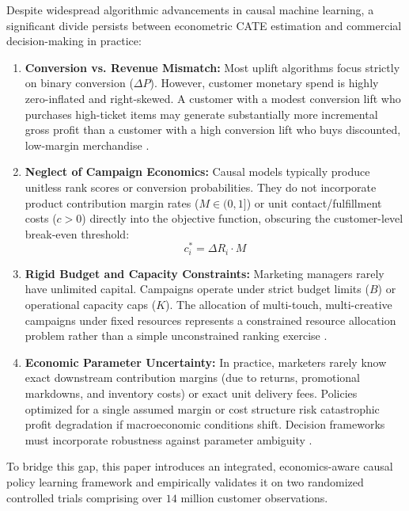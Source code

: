\documentclass[11pt,a4paper]{article}
\begin{document}
Despite widespread algorithmic advancements in causal machine learning, a significant divide persists between econometric CATE estimation and commercial decision-making in practice:
\begin{enumerate}
    \item \textbf{Conversion vs. Revenue Mismatch:} Most uplift algorithms focus strictly on binary conversion ($\Delta P$). However, customer monetary spend is highly zero-inflated and right-skewed. A customer with a modest conversion lift who purchases high-ticket items may generate substantially more incremental gross profit than a customer with a high conversion lift who buys discounted, low-margin merchandise \citep{lo2002true, gubela2019conversion}.
    \item \textbf{Neglect of Campaign Economics:} Causal models typically produce unitless rank scores or conversion probabilities. They do not incorporate product contribution margin rates ($M \in (0, 1]$) or unit contact/fulfillment costs ($c > 0$) directly into the objective function, obscuring the customer-level break-even threshold:
    \begin{equation}
    c^*_{i} = \Delta R_i \cdot M
    \end{equation}
    \item \textbf{Rigid Budget and Capacity Constraints:} Marketing managers rarely have unlimited capital. Campaigns operate under strict budget limits ($B$) or operational capacity caps ($K$). The allocation of multi-touch, multi-creative campaigns under fixed resources represents a constrained resource allocation problem rather than a simple unconstrained ranking exercise \citep{hauser2009non, sun2021budget}.
    \item \textbf{Economic Parameter Uncertainty:} In practice, marketers rarely know exact downstream contribution margins (due to returns, promotional markdowns, and inventory costs) or exact unit delivery fees. Policies optimized for a single assumed margin or cost structure risk catastrophic profit degradation if macroeconomic conditions shift. Decision frameworks must incorporate robustness against parameter ambiguity \citep{savage1951theory, manski2000identification}.
\end{enumerate}

To bridge this gap, this paper introduces an integrated, economics-aware causal policy learning framework and empirically validates it on two randomized controlled trials comprising over $14$ million customer observations.
\end{document}
